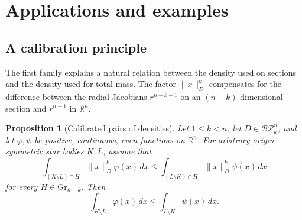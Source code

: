\documentclass{amsart}
\newtheorem{proposition}[theorem]{Proposition}
\newtheorem{corollary}[theorem]{Corollary}
\theoremstyle{remark}
\newcommand{\R}{\mathbb{R}}
\newcommand{\BP}{\mathcal{BP}}
\newcommand{\Gr}{\mathrm{Gr}}
\newcommand{\dd}{\,d}
\begin{document}

\section{Applications and examples}
\label{sec:applications}

\subsection{A calibration principle}

The first family explains a natural relation between the density used on
sections and the density used for total mass. The factor
$\lVert x\rVert_D^k$ compensates for the difference between the radial
Jacobians $r^{n-k-1}$ on an $(n-k)$-dimensional section and $r^{n-1}$ in
$\R^n$.

\begin{proposition}[Calibrated pairs of densities]\label{prop:calibration}
Let $1\leq k<n$, let $D\in\BP_k^n$, and let $\varphi,\psi$ be positive,
continuous, even functions on $\R^n$. For arbitrary origin-symmetric star
bodies $K,L$, assume that
\begin{equation}\label{eq:calibrated-sections}
 \int_{(K\setminus L)\cap H}
       \lVert x\rVert_D^k\varphi(x)\dd x
 \leq
 \int_{(L\setminus K)\cap H}
       \lVert x\rVert_D^k\psi(x)\dd x
\end{equation}
for every $H\in\Gr_{n-k}$. Then
\begin{equation}\label{eq:calibrated-total}
 \int_{K\setminus L}\varphi(x)\dd x
 \leq
 \int_{L\setminus K}\psi(x)\dd x.
\end{equation}
\end{proposition}
\end{document}
